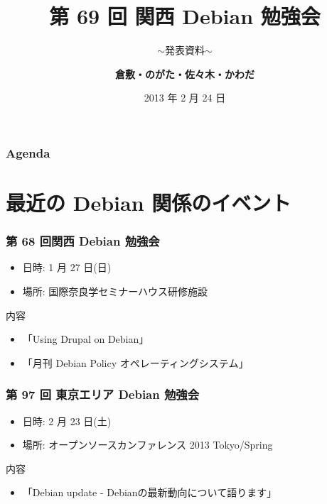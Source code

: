 \documentclass[cjk,dvipdfmx,10pt,compress,%
hyperref={bookmarks=true,bookmarksnumbered=true,bookmarksopen=false,%
colorlinks=false,%
pdftitle={第 69 回 関西 Debian 勉強会},%
pdfauthor={倉敷・のがた・佐々木・かわだ},%
pdfsubject={資料},%
}]{beamer}
\title{第 69 回 関西 Debian 勉強会}
\subtitle{$\sim$発表資料$\sim$}
\author[かわだ てつたろう]{{\large\bf 倉敷・のがた・佐々木・かわだ}}
\institute[Debian JP]{{\normalsize\tt 関西 Debian 勉強会}}
\date{{\small 2013 年 2 月 24 日}}
\begin{document}
\settitleslide
\begin{frame}
\titlepage
\end{frame}
\setdefaultslide

\begin{frame}[fragile]
\frametitle{Agenda}

\tableofcontents

\end{frame}

\section{最近の Debian 関係のイベント}


\begin{frame}[fragile]
  \frametitle{第 68 回関西 Debian 勉強会}
  \begin{itemize}
  \item 日時: 1 月 27 日(日)
  \item 場所: 国際奈良学セミナーハウス研修施設
  \end{itemize}
  \begin{block}{内容}
    \begin{itemize}
    \item「Using Drupal on Debian」
    \item「月刊 Debian Policy オペレーティングシステム」
    \end{itemize}
  \end{block}
\end{frame}

\begin{frame}[fragile]
  \frametitle{第 97 回 東京エリア Debian 勉強会}
  \begin{itemize}
  \item 日時: 2 月 23 日(土)
  \item 場所: オープンソースカンファレンス 2013 Tokyo/Spring
  \end{itemize}
  \begin{block}{内容}
    \begin{itemize}
    \item 「Debian update - Debianの最新動向について語ります」
    \end{itemize}
  \end{block}
\end{frame}
\end{document}
